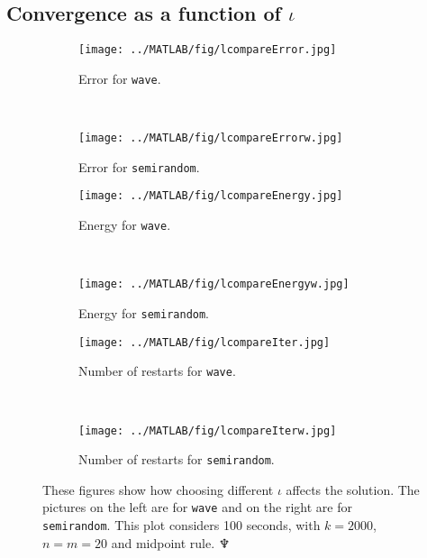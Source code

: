 \subsection{Convergence as a function of $\iota$}%
\begin{figure}[H]
        \centering
        \begin{subfigure}[b]{0.45\textwidth}
                \texttt{[image: ../MATLAB/fig/lcompareError.jpg]}
                \caption{ Error for \texttt{wave}. }
                \label{fig:lcompareError}
        \end{subfigure}
		~
		\begin{subfigure}[b]{0.45\textwidth}
                \texttt{[image: ../MATLAB/fig/lcompareErrorw.jpg]}
                \caption{ Error for \texttt{semirandom}. }
                \label{fig:lcompareErrorw}
        \end{subfigure}
        
                \begin{subfigure}[b]{0.45\textwidth}
                \texttt{[image: ../MATLAB/fig/lcompareEnergy.jpg]}
                \caption{ Energy for \texttt{wave}. }
                \label{fig:lcompareEnergy}
        \end{subfigure}
		~
		\begin{subfigure}[b]{0.45\textwidth}
                \texttt{[image: ../MATLAB/fig/lcompareEnergyw.jpg]}
                \caption{ Energy for \texttt{semirandom}. }
                \label{fig:lcompareEnergyw}
        \end{subfigure}
        
                \begin{subfigure}[b]{0.45\textwidth}
                \texttt{[image: ../MATLAB/fig/lcompareIter.jpg]}
                \caption{ Number of restarts for \texttt{wave}. }
                \label{fig:lcompareIter}
        \end{subfigure}
		~
		\begin{subfigure}[b]{0.45\textwidth}
                \texttt{[image: ../MATLAB/fig/lcompareIterw.jpg]}
                \caption{ Number of restarts for \texttt{semirandom}. }
                \label{fig:lcompareIterw}
        \end{subfigure}
        \caption{ These figures show how choosing different $\iota$ affects the solution. The pictures on the left are for \texttt{wave} and on the right are for \texttt{semirandom}. This plot considers 100 seconds, with $k = 2000$, $n = m = 20$ and midpoint rule. \hfill $\neptune$  }
        \label{fig:lcompare}
\end{figure}
